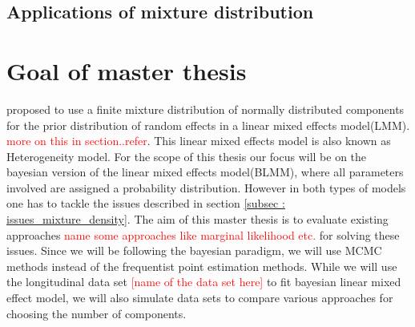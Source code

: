 \subsection{Applications of mixture distribution}

\section{Goal of master thesis}
\label{sec : goal}
\citet*{verbeke_linear_1996} proposed to use a finite mixture distribution of normally distributed components for the prior distribution of random effects in a linear mixed effects model(LMM). \textcolor{red}{more on this in section..refer}. This linear mixed effects model is also known as Heterogeneity model. For the scope of this thesis our focus will be on the bayesian version of the linear mixed effects model(BLMM), where all parameters involved are assigned a probability distribution. However in both types of models one has to tackle the issues described in section \ref{subsec : issues_mixture_density}. The aim of this master thesis is to evaluate existing approaches \textcolor{red}{name some approaches like marginal likelihood etc.} for solving these issues. Since we will be following the bayesian paradigm, we will use MCMC methods instead of the frequentist point estimation methods. While we will use the longitudinal data set \textcolor{red}{[name of the data set here]} to fit bayesian linear mixed effect model, we will also simulate data sets to compare various approaches for choosing the number of components.